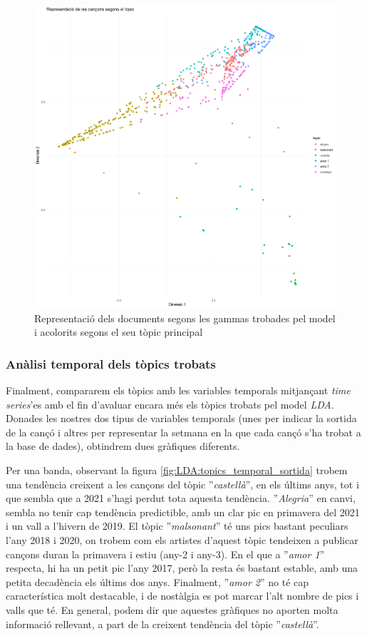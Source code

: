 \begin{figure}[H]
    \centering
    \includegraphics[width=0.95\linewidth]{Images/8_Textual/LDA/MDS_docs_by_topic.png}
    \caption{Representació dels documents segons les gammas trobades pel model i acolorits segons el seu tòpic principal}
    \label{fig:LDA:MDS_docs_by_topic}
\end{figure}


\subsubsection{Anàlisi temporal dels tòpics trobats}

Finalment, compararem els tòpics amb les variables temporals mitjançant \textit{time series}'es amb el fin d'avaluar encara més els tòpics trobats pel model \textit{LDA}. Donades les nostres dos tipus de variables temporals (unes per indicar la sortida de la cançó i altres per representar la setmana en la que cada cançó s'ha trobat a la base de dades), obtindrem dues gràfiques diferents.

Per una banda, observant la figura \ref{fig:LDA:topics_temporal_sortida} trobem una tendència creixent a les cançons del tòpic ''\textit{castellà}'', en els últims anys, tot i que sembla que a 2021 s'hagi perdut tota aquesta tendència. ''\textit{Alegria}'' en canvi, sembla no tenir cap tendència predictible, amb un clar pic en primavera del 2021 i un vall a l'hivern de 2019. El tòpic ''\textit{malsonant}'' té uns pics bastant peculiars l'any 2018 i 2020, on trobem com els artistes d'aquest tòpic tendeixen a publicar cançons duran la primavera i estiu (any-2 i any-3). En el que a ''\textit{amor 1}'' respecta, hi ha un petit pic l'any 2017, però la resta és bastant estable, amb una petita decadència els últims dos anys. Finalment, ''\textit{amor 2}'' no té cap característica molt destacable, i de nostàlgia es pot marcar l'alt nombre de pics i valls que té. En general, podem dir que aquestes gràfiques no aporten molta informació rellevant, a part de la creixent tendència del tòpic ''\textit{castellà}''.

